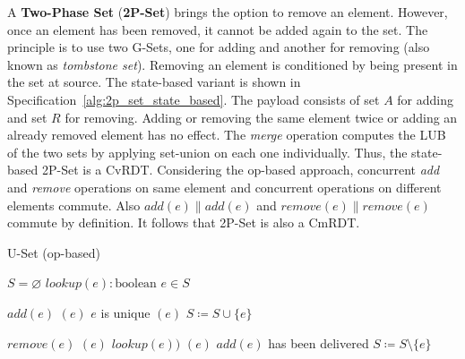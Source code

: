 A \textbf{Two-Phase Set} (\textbf{2P-Set}) brings the option to remove an
element. However, once an element has been removed, it cannot be added again to
the set. The principle is to use two G-Sets, one for adding and another for
removing (also known as \textit{tombstone set}). Removing an element is
conditioned by being present in the set at source. The state-based variant is
shown in Specification~\ref{alg:2p_set_state_based}. The payload consists of set
$A$ for adding and set $R$ for removing. Adding or removing the same element
twice or adding an already removed element has no effect. The \textit{merge}
operation computes the LUB of the two sets by applying set-union on each one
individually. Thus, the state-based 2P-Set is a CvRDT. Considering the op-based
approach, concurrent \textit{add} and \textit{remove} operations on same element
and concurrent operations on different elements commute. Also $\textit{add}(e)
\parallel \textit{add}(e)$ and $\textit{remove}(e) \parallel \textit{remove}(e)$
commute by definition. It follows that 2P-Set is also a CmRDT.

\begin{algorithm}[t]
\small{
	\caption{U-Set (op-based)}
 	\label{alg:u_set_op_based}                       

 	\begin{algorithmic}[1]
 	  \State \Payload $S = \varnothing$
 	  \State \Query $lookup(e) : \text{boolean}$
 	  \State \hspace{\algorithmicindent} \Return $e \in S$
 	  
 	  \State \Update $add(e)$
 	  \State \hspace{\algorithmicindent} \Prepare $(e)$
 	  \State \hspace{\algorithmicindent}\hspace{\algorithmicindent} \Pre $e$ is unique 
 	  \State \hspace{\algorithmicindent} \Effect $(e)$ 
 	  \State \hspace{\algorithmicindent}\hspace{\algorithmicindent} $S \coloneqq S \cup \{e\}$
 	  
 	  \State \Update $remove(e)$
 	  \State \hspace{\algorithmicindent} \Prepare $(e)$
 	  \State \hspace{\algorithmicindent}\hspace{\algorithmicindent} \Pre $lookup(e))$ 
 	  \State \hspace{\algorithmicindent} \Effect $(e)$ 
 	  \State \hspace{\algorithmicindent}\hspace{\algorithmicindent} \Pre $add(e)$ has been delivered
 	  \State \hspace{\algorithmicindent}\hspace{\algorithmicindent} $S \coloneqq S \setminus \{e\}$
	\end{algorithmic}
 }
\end{algorithm}

